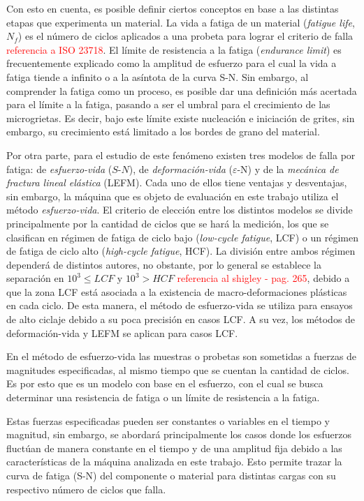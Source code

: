 Con esto en cuenta, es posible definir ciertos conceptos en base a las distintas etapas que experimenta un material. La vida a fatiga de un material (\textit{fatigue life}, $N_f$) es el número de ciclos aplicados a una probeta para lograr el criterio de falla \textcolor{red}{referencia a ISO 23718}. El límite de resistencia a la fatiga (\textit{endurance limit}) es frecuentemente explicado como la amplitud de esfuerzo para el cual la vida a fatiga tiende a infinito o a la asíntota de la curva S-N. Sin embargo, al comprender la fatiga como un proceso, es posible dar una definición más acertada para el límite a la fatiga, pasando a ser el umbral para el crecimiento de las microgrietas. Es decir, bajo este límite existe nucleación e iniciación de grites, sin embargo, su crecimiento está limitado a los bordes de grano del material.

Por otra parte, para el estudio de este fenómeno existen tres modelos de falla por fatiga: de \textit{esfuerzo-vida} ($S$-$N$), de \textit{deformación-vida }($\varepsilon$-N) y de la \textit{mecánica de fractura lineal elástica} (LEFM). Cada uno de ellos tiene ventajas y desventajas, sin embargo, la máquina que es objeto de evaluación en este trabajo utiliza el método \textit{esfuerzo-vida}. El criterio de elección entre los distintos modelos se divide principalmente por la cantidad de ciclos que se hará la medición, los que se clasifican en régimen de fatiga de ciclo bajo (\textit{low-cycle fatigue}, LCF) o un régimen de fatiga de ciclo alto (\textit{high-cycle fatigue}, HCF). La división entre ambos régimen dependerá de distintos autores, no obstante, por lo general se establece la separación en $10^3 \leq LCF$ y $10^3 > HCF$ \textcolor{red}{referencia al shigley - pag. 265}, debido a que la zona LCF está asociada a la existencia de macro-deformaciones plásticas en cada ciclo. De esta manera, el método de esfuerzo-vida se utiliza para ensayos de alto ciclaje debido a su poca precisión en casos LCF. A su vez, los métodos de deformación-vida y LEFM se aplican para casos LCF.

En el método de esfuerzo-vida las muestras o probetas son sometidas a fuerzas de magnitudes especificadas, al mismo tiempo que se cuentan la cantidad de ciclos. Es por esto que es un modelo con base en el esfuerzo, con el cual se busca determinar una resistencia de fatiga o un límite de resistencia a la fatiga. 

Estas fuerzas especificadas pueden ser constantes o variables en el tiempo y magnitud, sin embargo, se abordará principalmente los casos donde los esfuerzos fluctúan de manera constante en el tiempo y de una amplitud fija debido a las características de la máquina analizada en este trabajo. Esto permite trazar la curva de fatiga (S-N) del componente o material para distintas cargas con su respectivo número de ciclos que falla.

